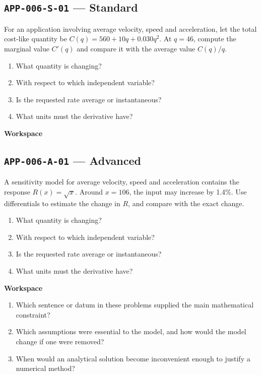 \documentclass[11pt]{book}
\newcommand{\pid}[1]{\texttt{#1}}
\newcommand{\workspace}{\par\vspace{0.7in}\hrulefill\par\vspace{0.55in}\hrulefill\par}
\begin{document}
\subsection*{\pid{APP-006-S-01} — Standard}
\begin{problembox}
For an application involving average velocity, speed and acceleration, let the total cost-like quantity be $C(q)=560+10q+0.030q^2$. At $q=46$, compute the marginal value $C'(q)$ and compare it with the average value $C(q)/q$.
\end{problembox}
\begin{promptbox}\begin{enumerate}
\item What quantity is changing?
\item With respect to which independent variable?
\item Is the requested rate average or instantaneous?
\item What units must the derivative have?
\end{enumerate}\end{promptbox}
\textbf{Workspace}\workspace
{}
\subsection*{\pid{APP-006-A-01} — Advanced}
\begin{problembox}
A sensitivity model for average velocity, speed and acceleration contains the response $R(x)=\sqrt{x}$. Around $x=106$, the input may increase by 1.4\%. Use differentials to estimate the change in $R$, and compare with the exact change.
\end{problembox}
\begin{promptbox}\begin{enumerate}
\item What quantity is changing?
\item With respect to which independent variable?
\item Is the requested rate average or instantaneous?
\item What units must the derivative have?
\end{enumerate}\end{promptbox}
\textbf{Workspace}\workspace
\begin{reflectionbox}\begin{enumerate}
\item Which sentence or datum in these problems supplied the main mathematical constraint?
\item Which assumptions were essential to the model, and how would the model change if one were removed?
\item When would an analytical solution become inconvenient enough to justify a numerical method?
\end{enumerate}\end{reflectionbox}
\end{document}
